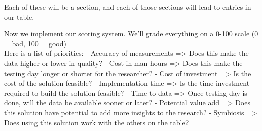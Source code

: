 \documentclass[11pt]{article}
\begin{document}
Each of these will be a section, and each of those sections will lead to
entries in our table.

    Now we implement our scoring system. We'll grade everything on a 0-100
scale (0 = bad, 100 = good)\\
Here is a list of priorities: - Accuracy of measurements =\textgreater{}
Does this make the data higher or lower in quality? - Cost in man-hours
=\textgreater{} Does this make the testing day longer or shorter for the
researcher? - Cost of investment =\textgreater{} Is the cost of the
solution feasible? - Implementation time =\textgreater{} Is the time
investment required to build the solution feasible? - Time-to-data
=\textgreater{} Once testing day is done, will the data be available
sooner or later? - Potential value add =\textgreater{} Does this
solution have potential to add more insights to the research? -
Symbiosis =\textgreater{} Does using this solution work with the others
on the table?
\end{document}
